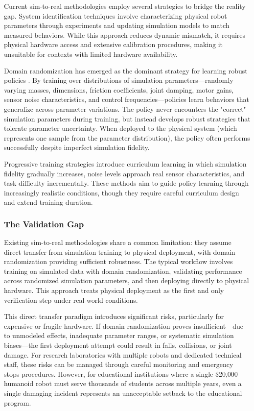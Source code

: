 \documentclass[12pt,a4paper]{article}
\begin{document}
Current sim-to-real methodologies employ several strategies to bridge the reality gap. System identification techniques involve characterizing physical robot parameters through experiments and updating simulation models to match measured behaviors. While this approach reduces dynamic mismatch, it requires physical hardware access and extensive calibration procedures, making it unsuitable for contexts with limited hardware availability.

Domain randomization has emerged as the dominant strategy for learning robust policies \parencite{gu2024humanoidgym}. By training over distributions of simulation parameters—randomly varying masses, dimensions, friction coefficients, joint damping, motor gains, sensor noise characteristics, and control frequencies—policies learn behaviors that generalize across parameter variations. The policy never encounters the "correct" simulation parameters during training, but instead develops robust strategies that tolerate parameter uncertainty. When deployed to the physical system (which represents one sample from the parameter distribution), the policy often performs successfully despite imperfect simulation fidelity.

Progressive training strategies introduce curriculum learning in which simulation fidelity gradually increases, noise levels approach real sensor characteristics, and task difficulty incrementally. These methods aim to guide policy learning through increasingly realistic conditions, though they require careful curriculum design and extend training duration.

\subsubsection{The Validation Gap}

Existing sim-to-real methodologies share a common limitation: they assume direct transfer from simulation training to physical deployment, with domain randomization providing sufficient robustness. The typical workflow involves training on simulated data with domain randomization, validating performance across randomized simulation parameters, and then deploying directly to physical hardware. This approach treats physical deployment as the first and only verification step under real-world conditions.

This direct transfer paradigm introduces significant risks, particularly for expensive or fragile hardware. If domain randomization proves insufficient—due to unmodeled effects, inadequate parameter ranges, or systematic simulation biases—the first deployment attempt could result in falls, collisions, or joint damage. For research laboratories with multiple robots and dedicated technical staff, these risks can be managed through careful monitoring and emergency stops procedures. However, for educational institutions where a single \$20,000 humanoid robot must serve thousands of students across multiple years, even a single damaging incident represents an unacceptable setback to the educational program.
\end{document}
